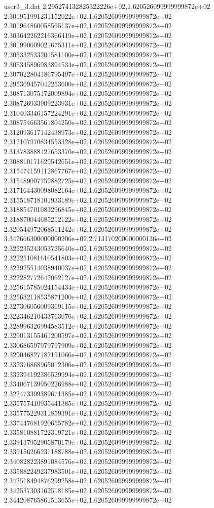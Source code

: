 \begin{filecontents}{user3_3.dat}
2.295274132825322226e+02,1.620526099999999872e+02
2.301951991231152022e+02,1.620526099999999872e+02
2.301964860058565137e+02,1.620526099999999872e+02
2.303642262216366419e+02,1.620526099999999872e+02
2.301990609021675311e+02,1.620526099999999872e+02
2.305332533201581100e+02,1.620526099999999872e+02
2.305345896983894534e+02,1.620526099999999872e+02
2.307022804186795497e+02,1.620526099999999872e+02
2.295369457042253600e+02,1.620526099999999872e+02
2.308713075172009894e+02,1.620526099999999872e+02
2.308726933909223931e+02,1.620526099999999872e+02
2.310403346157224291e+02,1.620526099999999872e+02
2.308754663561804250e+02,1.620526099999999872e+02
2.312093617142438973e+02,1.620526099999999872e+02
2.312107970834553328e+02,1.620526099999999872e+02
2.313783888127653370e+02,1.620526099999999872e+02
2.308810171629542651e+02,1.620526099999999872e+02
2.315474159112867767e+02,1.620526099999999872e+02
2.315489007759882725e+02,1.620526099999999872e+02
2.317164430098082164e+02,1.620526099999999872e+02
2.315518718101933189e+02,1.620526099999999872e+02
2.318854701083296845e+02,1.620526099999999872e+02
2.318870044685212122e+02,1.620526099999999872e+02
2.320544972068511242e+02,1.620526099999999872e+02
3.342666300000000206e+02,2.713170200000000136e+02
2.322235243053725640e+02,1.620526099999999872e+02
2.322251081610541803e+02,1.620526099999999872e+02
2.323925514038940037e+02,1.620526099999999872e+02
2.322282772642062127e+02,1.620526099999999872e+02
2.325615785024154434e+02,1.620526099999999872e+02
2.325632118535871200e+02,1.620526099999999872e+02
2.327306056009369115e+02,1.620526099999999872e+02
2.322346210433763076e+02,1.620526099999999872e+02
2.328996326994583512e+02,1.620526099999999872e+02
2.329013155461200597e+02,1.620526099999999872e+02
2.330686597979797909e+02,1.620526099999999872e+02
2.329046827182191066e+02,1.620526099999999872e+02
2.332376868965012306e+02,1.620526099999999872e+02
2.332394192386529994e+02,1.620526099999999872e+02
2.334067139950226988e+02,1.620526099999999872e+02
2.322473309389671385e+02,1.620526099999999872e+02
2.335757410935441385e+02,1.620526099999999872e+02
2.335775229311859391e+02,1.620526099999999872e+02
2.337447681920655782e+02,1.620526099999999872e+02
2.335810881722319721e+02,1.620526099999999872e+02
2.339137952905870179e+02,1.620526099999999872e+02
2.339156266237188788e+02,1.620526099999999872e+02
2.340828223891084576e+02,1.620526099999999872e+02
2.335882249237983501e+02,1.620526099999999872e+02
2.342518494876299258e+02,1.620526099999999872e+02
2.342537303162518185e+02,1.620526099999999872e+02
2.344208765861513655e+02,1.620526099999999872e+02

\end{filecontents}
